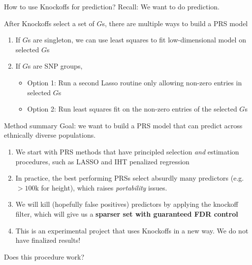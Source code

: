 \documentclass[aspectratio=169, 10pt]{beamer}
\begin{document}
\begin{frame}{How to use Knockoffs for prediction?}
    Recall: We want to do prediction. 
    
    After Knockoffs select a set of $G$s, there are multiple ways to build a PRS model
    \begin{enumerate}
        \item If $G$s are singleton, we can use least squares to fit low-dimensional model on selected $G$s
        \item If $G$s are SNP groups, 
        \begin{itemize}
            \item Option 1: Run a second Lasso routine only allowing non-zero entries in selected $G$s
            \item Option 2: Run least squares fit on the non-zero entries of the selected $G$s
        \end{itemize}
    \end{enumerate}
\end{frame}

\begin{frame}{Method summary}
Goal: we want to build a PRS model that can predict across ethnically diverse populations.
\begin{enumerate}
    \item We start with PRS methods that have principled selection \textit{and} estimation procedures, such as LASSO and IHT penalized regression
    \item In practice, the best performing PRSs select absurdly many predictors (e.g. $>100$k for height), which raises \textit{portability} issues. 
    \item We will kill (hopefully false positives) predictors  by applying the knockoff filter, which will give us a \textbf{sparser set with guaranteed FDR control}
    \item \alert{This is an experimental project that uses Knockoffs in a new way. We do not have finalized results!}
\end{enumerate}
Does this procedure work?
\end{frame}
\end{document}
